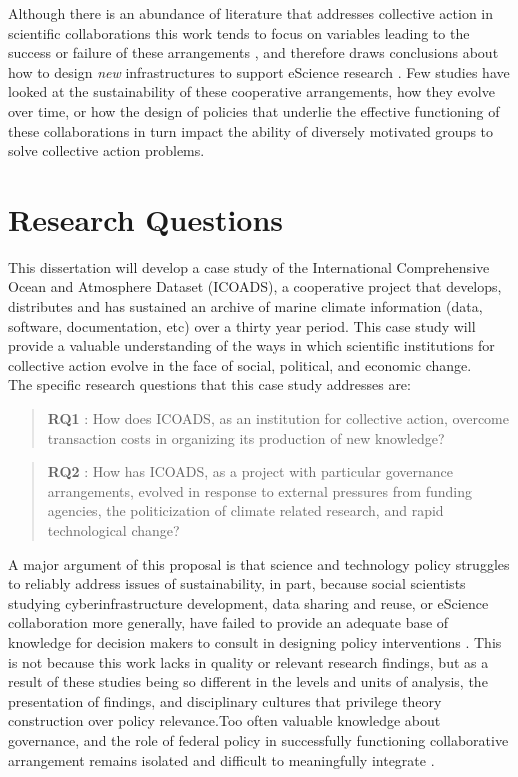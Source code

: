 \documentclass[thesis,tocnosub,noragright,centerchapter,12pt]{uiucecethesis09}
\begin{document}
Although there is an abundance of literature that addresses collective action in scientific collaborations 
 \citep[e.g.][]{sonnenwald2007scientific} this work tends to focus on variables
leading to the success or failure of these arrangements \citep[e.g.][]{finholt2002collaboratories}, and therefore draws conclusions about how to design \emph{new}
infrastructures to support eScience research \citep{jirotka2013supporting}.
Few studies have looked at the sustainability of these cooperative arrangements, how
they evolve over time, or how the design of policies that underlie the
effective functioning of these collaborations in turn impact the ability
of diversely motivated groups to solve collective action problems.\\

\section{Research Questions}

This dissertation will develop a case study of the International
Comprehensive Ocean and Atmosphere Dataset (ICOADS), a cooperative project that develops, distributes and has sustained
an archive of marine climate information (data, software, documentation,
etc) over a thirty year period. This case study will provide a valuable understanding of the
ways in which scientific institutions for collective action evolve in
the face of social, political, and economic change.\\

The specific research questions that this case study addresses are:

\begin{quote}
\textbf{RQ1} : How does ICOADS, as an institution for collective action,
overcome transaction costs in organizing its production of new
knowledge?
\end{quote}

\begin{quote}
\textbf{RQ2} : How has ICOADS, as a project with particular
governance arrangements, evolved in response to external pressures from
funding agencies, the politicization of climate related research, and
rapid technological change?
\end{quote}

A major argument of this proposal is that science and technology policy
struggles to reliably address issues of sustainability, in part, because
social scientists studying cyberinfrastructure development, data sharing
and reuse, or eScience collaboration more generally, have failed to
provide an adequate base of knowledge for decision makers to consult
in designing policy interventions
\citep{miller2013facto}. This is not because this work lacks in quality
or relevant research findings, but as a result of these studies being so different in the levels and units of analysis, the presentation of findings, and disciplinary cultures that privilege theory construction over policy relevance.Too often valuable knowledge about governance, and the role of federal policy in successfully functioning collaborative arrangement remains isolated and difficult to meaningfully integrate \citep{jackson2013cscw, jackson2014policy}.\\
\end{document}

